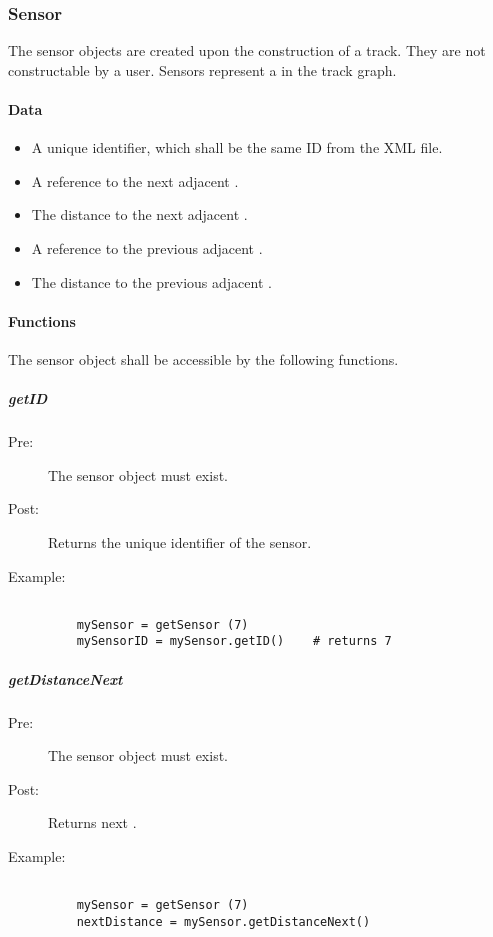 \documentclass[a4paper,11pt,notitlepage]{article}
\begin{document}
\subsubsection{Sensor}
The sensor objects are created upon the construction of a track. They are not constructable by a user. Sensors represent a \TN in the track graph.
\paragraph{Data}
\begin{itemize}
\item A unique identifier, which shall be the same ID from the XML file.
\item A reference to the next adjacent \TN.
\item The distance to the next adjacent \TN.
\item A reference to the previous adjacent \TN.
\item The distance to the previous adjacent \TN.
\end{itemize}
\paragraph{Functions}
The sensor object shall be accessible by the following functions.\\
\subparagraph{getID}
\begin{description}
\item[\hspace{1cm}Pre:] The sensor object must exist.
\item[\hspace{1cm}Post:] Returns the unique identifier of the sensor.
\item[\hspace{1cm}Example:]
\begin{verbatim}

    mySensor = getSensor (7)
    mySensorID = mySensor.getID()    # returns 7
\end{verbatim}
\end{description}

\subparagraph{getDistanceNext}
\begin{description}
\item[\hspace{1cm}Pre:] The sensor object must exist.
\item[\hspace{1cm}Post:] Returns next \TN.
\item[\hspace{1cm}Example:]
\begin{verbatim}

    mySensor = getSensor (7)
    nextDistance = mySensor.getDistanceNext()
\end{verbatim}
\end{description}
\end{document}
